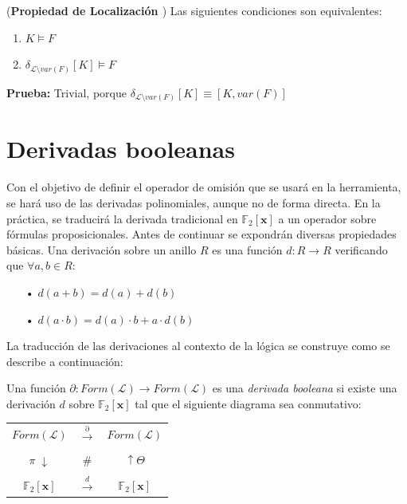 \cor (\textbf{Propiedad de Localización \cite{Borrego2009}}) Las siguientes condiciones son equivalentes:
\begin{enumerate}
\item $K \vDash F$
\item $\delta_{\mathcal{L} \setminus var(F)} [K] \vDash F$
\end{enumerate}

\noindent \textbf{Prueba:} Trivial, porque $\delta_{\mathcal{L} \setminus var(F)} [K] \equiv [K,var(F)]$

\section{Derivadas booleanas}
Con el objetivo de definir el operador de omisión que se usará en la herramienta, se hará uso de las derivadas polinomiales, aunque no de forma directa. En la práctica, se traducirá la derivada tradicional en $\mathbb{F}_2 [\textbf{x}]$ a un operador sobre fórmulas proposicionales. Antes de continuar se expondrán diversas propiedades básicas. Una derivación sobre un anillo $R$ es una función $d:R \rightarrow R$ verificando que $\forall a,b \in R$:

\begin{itemize}
\item[•] $d(a+b) = d(a) + d(b)$
\item[•] $d(a \cdot b) = d(a) \cdot b + a \cdot d(b)$
\end{itemize}

La traducción de las derivaciones al contexto de la lógica se construye como se describe a continuación:

 \cite{Borrego2009} Una función $\partial : Form(\mathcal{L}) \rightarrow Form(\mathcal{L})$ es una \textit{derivada booleana} si existe una derivación $d$ sobre $\mathbb{F}_2 [\textbf{x}]$ tal que el siguiente diagrama sea conmutativo:

\begin{table}[h]
\centering
\begin{tabular}{ccc}
 $Form(\mathcal{L})$& $\xrightarrow{\partial} $ & $Form(\mathcal{L})$ \\ \\
 $\pi \; \downarrow $ & $\#$ & $\uparrow \Theta$ \\\\
 $\mathbb{F}_2 [\textbf{x}]$ & $\xrightarrow{d}$ & $\mathbb{F}_2 [\textbf{x}]$
\end{tabular}
\end{table}
 
